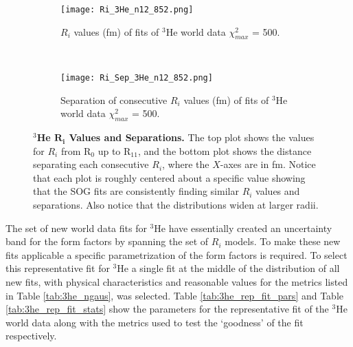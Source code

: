 \begin{figure}[!ht]
\begin{subfigure}{1.\textwidth}
  \centering
  \texttt{[image: Ri\_3He\_n12\_852.png]}
  \caption{$R_i$ values (fm) of fits of $^3$He world data $\chi^2_{max}$ = 500.}
  \label{fig:3he_ri_ind}
\end{subfigure}\\
\begin{subfigure}{1.\textwidth}
  \centering
  \texttt{[image: Ri\_Sep\_3He\_n12\_852.png]}
  \caption{Separation of consecutive $R_i$ values (fm) of fits of $^3$He world data $\chi^2_{max}$ = 500.}
  \label{fig:3he_ri_sep}
\end{subfigure}
\caption[$^3$He $R_i$ Values and Separations]{{\bf{$^3$He $\boldsymbol{R_i}$ Values and Separations.}} The top plot shows the values for $R_i$ from R$_0$ up to R$_{11}$, and the bottom plot shows the distance separating each consecutive $R_i$, where the $X$-axes are in fm. Notice that each plot is roughly centered about a specific value showing that the SOG fits are consistently finding similar $R_i$ values and separations. Also notice that the distributions widen at larger radii.}
\label{fig:3he_ri}
\end{figure}

The set of new world data fits for $^3$He have essentially created an uncertainty band for the form factors by spanning the set of $R_i$ models. To make these new fits applicable a specific parametrization of the form factors is required. To select this representative fit for $^3$He a single fit at the middle of the distribution of all new fits, with physical characteristics and reasonable values for the metrics listed in Table \ref{tab:3he_ngaus}, was selected. Table \ref{tab:3he_rep_fit_pars} and Table \ref{tab:3he_rep_fit_stats} show the parameters for the representative fit of the $^3$He world data along with the metrics used to test the `goodness' of the fit respectively.

